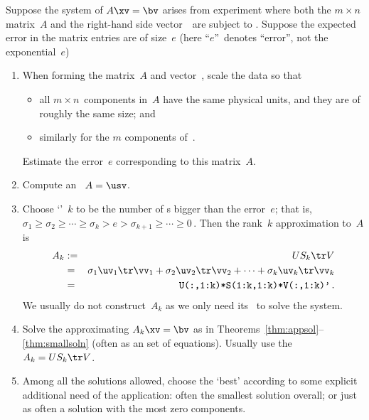 \begin{procedure} \label{pro:appmat}
Suppose the system of  \(A\xv=\bv\) arises from experiment where both the \(m\times n\) matrix~\(A\) and the right-hand side vector~\bv\ are subject to .  
Suppose the expected error in the matrix entries are of size~\(e\) (here ``\(e\)''~denotes ``error'', not the exponential~\(e\))
\begin{enumerate}
\item When forming the matrix~\(A\) and vector~\bv, scale the data so that 
\begin{itemize}
\item all \(m\times n\)~components in~\(A\) have the same physical units, and they are of roughly the same size; and
\item similarly for the \(m\) components of~\bv.
\end{itemize}
Estimate the error~\(e\) corresponding to this matrix~\(A\).
 
\item Compute an \svd\ \(A=\usv\).

\item Choose `'~\(k\) to be the number of s bigger than the error~\(e\); that is, \(\sigma_1\geq \sigma_2\geq\cdots \geq \sigma_k>e>\sigma_{k+1}\geq \cdots\geq 0\)\,.
Then the rank~\(k\) approximation to~\(A\) is
\begin{eqnarray*}
A_k&:=&US_k\tr V
\\&=&\sigma_1\uv_1\tr\vv_1+\sigma_2\uv_2\tr\vv_2+\cdots+\sigma_k\uv_k\tr\vv_k
\\&=&\verb|U(:,1:k)*S(1:k,1:k)*V(:,1:k)'|\,.
\end{eqnarray*}
We usually do not construct~\(A_k\) as we only need its \svd\ to solve the system.

\item Solve the approximating  \(A_k\xv=\bv\) as in Theorems~\ref{thm:appsol}--\ref{thm:smallsoln} (often as an  set of equations).
Usually use the \svd\ \(A_k=US_k\tr V\).

\item Among all the solutions allowed, choose the `best' according to some explicit additional need of the application: often the smallest solution overall; or just as often a solution with the most zero components.
\end{enumerate}
\end{procedure}


